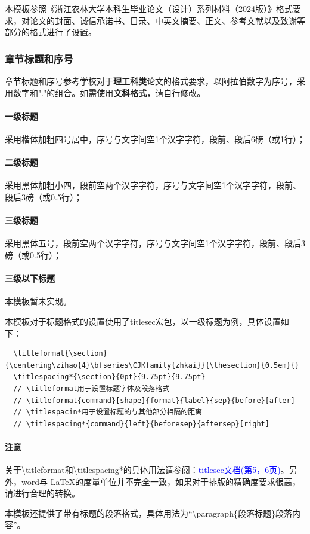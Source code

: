 \documentclass[AutoFakeBold]{ZafuThesis}
\begin{document}
本模板参照《浙江农林大学本科生毕业论文（设计）系列材料（2024版）》格式要求，对论文的封面、诚信承诺书、目录、中英文摘要、正文、参考文献以及致谢等部分的格式进行了设置。

\subsubsection{章节标题和序号}

章节标题和序号参考学校对于\textbf{理工科类}论文的格式要求，以阿拉伯数字为序号，采用数字和"."的组合。如需使用\textbf{文科格式}，请自行修改。
\paragraph{一级标题}采用楷体加粗四号居中，序号与文字间空1个汉字字符，段前、段后6磅（或1行）；
\paragraph{二级标题}采用黑体加粗小四，段前空两个汉字字符，序号与文字间空1个汉字字符，段前、段后3磅（或0.5行）；
\paragraph{三级标题}采用黑体五号，段前空两个汉字字符，序号与文字间空1个汉字字符，段前、段后3磅（或0.5行）；
\paragraph{三级以下标题}本模板暂未实现。

\par 本模板对于标题格式的设置使用了titlesec宏包，以一级标题为例，具体设置如下：
\begin{lstlisting}
  \titleformat{\section}{\centering\zihao{4}\bfseries\CJKfamily{zhkai}}{\thesection}{0.5em}{}
  \titlespacing*{\section}{0pt}{9.75pt}{9.75pt}
  // \titleformat用于设置标题字体及段落格式 
  // \titleformat{command}[shape]{format}{label}{sep}{before}[after]
  // \titlespacin*用于设置标题的与其他部分相隔的距离
  // \titlespacing*{command}{left}{beforesep}{aftersep}[right]
\end{lstlisting}
\paragraph{注意} 关于\textbackslash titleformat和\textbackslash titlespacing*的具体用法请参阅：\href{https://static.latexstudio.net/wp-content/uploads/2016/12/titlesec_c.pdf}{\textcolor{blue}{titlesec文档(第5，6页)}}。另外，word与 \LaTeX 的度量单位并不完全一致，如果对于排版的精确度要求很高，请进行合理的转换。
\par 本模板还提供了带有标题的段落格式，具体用法为“\textbackslash paragraph\{段落标题\}段落内容”。
\end{document}
